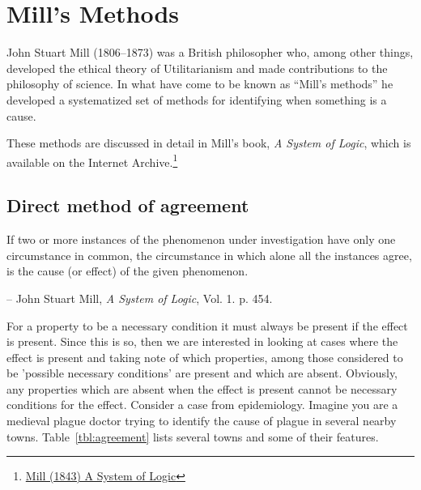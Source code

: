 \chapter{Mill's Methods}
\label{ch:millsmethods}
\setlength{\parindent}{1em}

John Stuart Mill (1806--1873) was a British philosopher who, among other things, developed the ethical theory of Utilitarianism and made contributions to the philosophy of science. In what have come to be known as ``Mill's methods'' he developed a systematized set of methods for identifying when something is a cause.

These methods are discussed in detail in Mill's book, \textit{A System of Logic}, which is available on the Internet Archive.\footnote{
\href{https://archive.org/details/systemofratiocin00milluoft/page/n6}{Mill (1843) A System of Logic}}

\section{Direct method of agreement}

\begin{displayquote}
    If two or more instances of the phenomenon under investigation have only one circumstance in common, the circumstance in which alone all the instances agree, is the cause (or effect) of the given phenomenon.

    -- John Stuart Mill, \textit{A System of Logic}, Vol. 1. p. 454.
\end{displayquote}

For a property to be a necessary condition it must always be present if the effect is present. Since this is so, then we are interested in looking at cases where the effect is present and taking note of which properties, among those considered to be 'possible necessary conditions' are present and which are absent. Obviously, any properties which are absent when the effect is present cannot be necessary conditions for the effect. Consider a case from epidemiology. Imagine you are a medieval plague doctor trying to identify the cause of plague in several nearby towns. Table~\ref{tbl:agreement} lists several towns and some of their features.

